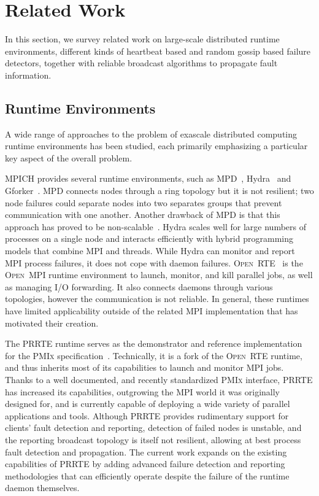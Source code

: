 \documentclass[5p,times,twocolumn]{elsarticle}
\newcommand{\prrte}[0]{\textsc{PRRTE}\xspace}
\newcommand{\pmix}[0]{\textsc{PMIx}\xspace}
\newcommand{\orte}[0]{\textsc{Open~RTE}\xspace}
\newcommand{\ompi}[0]{\textsc{Open~MPI}\xspace}
\newcommand{\mpi}[0]{\textsc{MPI}\xspace}
\begin{document}
\section{Related Work}\label{sec:related}
In this section, we survey related work on large-scale distributed runtime environments, different kinds of heartbeat based and random gossip based failure detectors, together with reliable broadcast algorithms to propagate fault information.

\subsection{Runtime Environments}
A wide range of approaches to the problem of exascale distributed computing runtime environments has been studied, each primarily emphasizing a particular key aspect of the overall problem.

MPICH provides several runtime environments, such as MPD~\cite{Butler00}, Hydra~\cite{MPICH14} and Gforker~\cite{MPICH14}. MPD connects nodes through a ring topology but it is not resilient; two node failures could separate nodes into two separates groups that prevent communication with one another. Another drawback of MPD is that this approach has proved to be non-scalable~\cite{Bosilca11}.
Hydra scales well for large numbers of processes on a single node and interacts efficiently with hybrid programming models that combine \mpi and threads. While Hydra can monitor
and report MPI process failures, it does not cope with daemon failures.
%
\orte~\cite{Castain05, Jeffrey12} is the \ompi runtime environment to launch, monitor, and kill parallel jobs, as well as managing I/O forwarding. It also connects daemons through various topologies, however the communication is not reliable. In general, these runtimes have limited applicability outside of the related \mpi implementation that has motivated their creation.

The \prrte runtime serves as the demonstrator and reference implementation
for the \pmix specification~\cite{CASTAIN18}. Technically, it is a fork of
the \orte runtime, and thus inherits most of its capabilities to launch
and monitor \mpi jobs. Thanks to a well documented, and recently standardized \pmix interface, \prrte
has increased its capabilities, outgrowing the \mpi world it was originally designed for, and is currently capable of
deploying a wide variety of parallel applications and tools.
Although \prrte provides rudimentary support for clients' fault detection and reporting,
detection of failed nodes is unstable, and the reporting
broadcast topology is itself not resilient, allowing at best process fault detection and propagation.
The current work expands on the existing capabilities of \prrte by adding
advanced failure detection and reporting methodologies that can efficiently operate
despite the failure of the runtime daemon themselves.
\end{document}
